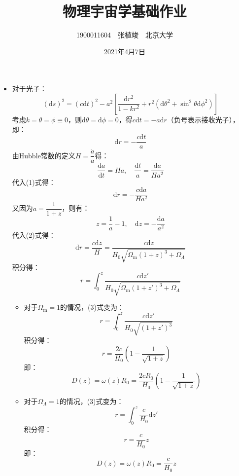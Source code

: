 \documentclass[a4paper,fontset=none]{ctexart}
\begin{document}
\title{\textbf{物理宇宙学基础作业}}
\author{1900011604\ \ 张植竣\ \ 北京大学}
\date{2021年4月7日}
\maketitle

\begin{itemize}

    \item[1.(a)] 对于光子：
    \[
    (\mathrm{d}s)^2 = (c\mathrm{d}t)^2 - a^2\left[\frac{\mathrm{d}r^2}{1-kr^2} + r^2\left(\mathrm{d}\theta^2+\sin^2\theta\mathrm{d}\phi^2\right)\right]
    \]
    考虑$k=\theta=\phi\equiv0$，则$\mathrm{d}\theta=\mathrm{d}\phi=0$，得$c\mathrm{d}t=-a\mathrm{d}r$（负号表示接收光子），即：
    \begin{equation}
        \mathrm{d}r = -\frac{c\mathrm{d}t}{a}
    \end{equation}
    由Hubble常数的定义$H=\dfrac{\dot{a}}{a}$得：
    \[
    \frac{\mathrm{d}a}{\mathrm{d}t} = Ha,\quad
    \frac{\mathrm{d}t}{a} = \frac{\mathrm{d}a}{Ha^2}
    \]
    代入(1)式得：
    \begin{equation}
        \mathrm{d}r = -\frac{c\mathrm{d}a}{Ha^2}
    \end{equation}
    又因为$a=\dfrac{1}{1+z}$，则有：
    \[
    z = \frac{1}{a} - 1,\quad
        \mathrm{d}z = -\frac{\mathrm{d}a}{a^2}
    \]
    代入(2)式得：
    \[
    \mathrm{d}r = \frac{c\mathrm{d}z}{H} = \frac{c\mathrm{d}z}{H_0\sqrt{\Omega_\mathrm{m}(1+z)^3+\Omega_\Lambda}}
    \]
    积分得：
    \begin{equation}
        r = \int_0^{z}\frac{c\mathrm{d}z'}{H_0\sqrt{\Omega_\mathrm{m}(1+z')^3+\Omega_\Lambda}}
    \end{equation}

    \begin{itemize}
        \item[$\bullet$] 对于$\Omega_\mathrm{m}=1$的情况，(3)式变为：
        \[
        r = \int_0^{z}\frac{c\mathrm{d}z'}{H_0\sqrt{(1+z')^3}}
        \]
        积分得：
        \[
        r = \frac{2c}{H_0}\left(1-\frac{1}{\sqrt{1+z}}\right)
        \]
        即：
        \[
        D(z) = \omega(z)R_0 = \frac{2cR_0}{H_0}\left(1-\frac{1}{\sqrt{1+z}}\right)
        \]

        \item[$\bullet$] 对于$\Omega_\Lambda=1$的情况，(3)式变为：
        \[
        r = \int_0^{z}\frac{c}{H_0}\mathrm{d}z'
        \]
        积分得：
        \[
        r = \frac{c}{H_0}z
        \]
        即：
        \[
        D(z) = \omega(z)R_0 = \frac{c}{H_0}z
        \]
    \end{itemize}


\end{itemize}
\end{document}
